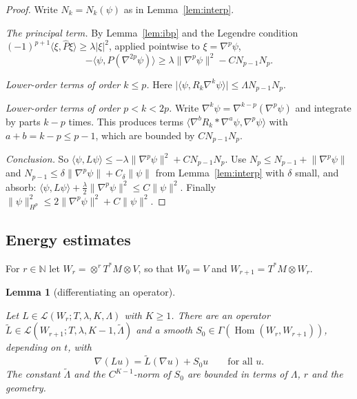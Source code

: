 \documentclass[11pt,reqno]{amsart}
\newtheorem{lemma}[theorem]{Lemma}
\theoremstyle{definition}
\theoremstyle{remark}
\newcommand{\N}{\mathbb{N}}
\newcommand{\Lcl}{\mathcal{L}}
\newcommand{\Hom}{\operatorname{Hom}}
\newcommand{\ip}[2]{\langle #1,#2\rangle}
\newcommand{\norm}[1]{\lVert #1\rVert}
\newcommand{\abs}[1]{\lvert #1\rvert}
\newcommand{\hatP}{\widehat{P}}
\newcommand{\lean}[1]{}
\newcommand{\uses}[1]{}
\numberwithin{equation}{section}
\begin{document}
\begin{proof}
\uses{lem:ibp, lem:interp}
Write $N_k=N_k(\psi)$ as in Lemma~\ref{lem:interp}.

\emph{The principal term.} By Lemma~\ref{lem:ibp} and the Legendre condition
$(-1)^{p+1}\ip{\xi}{\hatP\xi}\ge\lambda\abs\xi^2$, applied pointwise to $\xi=\nabla^p\psi$,
\[
  -\ip{\psi}{P(\nabla^{2p}\psi)}\ge\lambda\norm{\nabla^p\psi}^2-C N_{p-1}N_p.
\]

\emph{Lower-order terms of order $k\le p$.} Here
$\abs{\ip{\psi}{R_k\nabla^k\psi}}\le\Lambda N_{p-1}N_p$.

\emph{Lower-order terms of order $p<k<2p$.} Write $\nabla^k\psi=\nabla^{k-p}(\nabla^p\psi)$ and
integrate by parts $k-p$ times. This produces terms $\ip{\nabla^b R_k*\nabla^a\psi}{\nabla^p\psi}$
with $a+b=k-p\le p-1$, which are bounded by $C N_{p-1}N_p$.

\emph{Conclusion.} So $\ip{\psi}{L\psi}\le-\lambda\norm{\nabla^p\psi}^2+C N_{p-1}N_p$. Use
$N_p\le N_{p-1}+\norm{\nabla^p\psi}$ and $N_{p-1}\le\delta\norm{\nabla^p\psi}+C_\delta\norm\psi$ from
Lemma~\ref{lem:interp} with $\delta$ small, and absorb:
$\ip{\psi}{L\psi}+\frac\lambda2\norm{\nabla^p\psi}^2\le C\norm\psi^2$. Finally
$\norm\psi_{H^p}^2\le2\norm{\nabla^p\psi}^2+C\norm\psi^2$.
\end{proof}

\subsection{Energy estimates}

For $r\in\N$ let $W_r=\otimes^rT^*M\otimes V$, so that $W_0=V$ and $W_{r+1}=T^*M\otimes W_r$.

\begin{lemma}[differentiating an operator]\label{lem:commute}
\lean{ShortTime.LinearOp.exists_covGrad_comm, ShortTime.LinearOp.isParabolic_comm, ShortTime.LinearOp.legendreForm_comm, ShortTime.isDiffOp_cycle_defect, ShortTime.IsDiffOp.split}
\uses{def:class}
Let $L\in\Lcl(W_r;T,\lambda,K,\Lambda)$ with $K\ge1$. There are an operator
$\tilde L\in\Lcl(W_{r+1};T,\lambda,K-1,\tilde\Lambda)$ and a smooth
$S_0\in\Gamma(\Hom(W_r,W_{r+1}))$, depending on $t$, with
\[
  \nabla(Lu)=\tilde L(\nabla u)+S_0u\qquad\text{for all }u.
\]
The constant $\tilde\Lambda$ and the $C^{K-1}$-norm of $S_0$ are bounded in terms of $\Lambda$, $r$
and the geometry.
\end{lemma}
\end{document}
